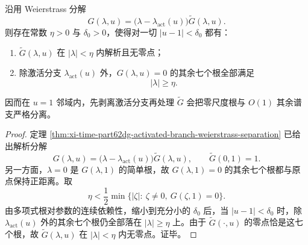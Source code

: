 \begin{conclusion}[剥离激活分支后的统一谱隙与解析稳定性]\label{con:xi-time-part62dga-deflated-uniform-gap}
沿用 Weierstrass 分解
\[
G(\lambda,u)=\bigl(\lambda-\lambda_{\mathrm{act}}(u)\bigr)\widetilde G(\lambda,u).
\]
则存在常数 \(\eta>0\) 与 \(\delta_0>0\)，使得对一切 \(|u-1|<\delta_0\) 都有：
\begin{enumerate}
  \item \(\widetilde G(\lambda,u)\) 在 \(|\lambda|<\eta\) 内解析且无零点；
  \item 除激活分支 \(\lambda_{\mathrm{act}}(u)\) 外，\(G(\lambda,u)=0\) 的其余七个根全部满足
  \[
  |\lambda|\ge \eta.
  \]
\end{enumerate}
因而在 \(u=1\) 邻域内，先剥离激活分支再处理 \(\widetilde G\) 会把零尺度根与 \(O(1)\) 其余谱支严格分离。
\end{conclusion}
\begin{proof}
定理 \ref{thm:xi-time-part62dg-activated-branch-weierstrass-separation} 已给出解析分解
\[
G(\lambda,u)
=
\bigl(\lambda-\lambda_{\mathrm{act}}(u)\bigr)\widetilde G(\lambda,u),
\qquad
\widetilde G(0,1)=1.
\]
另一方面，\(\lambda=0\) 是 \(G(\lambda,1)\) 的简单根，故 \(G(\lambda,1)=0\) 的其余七个根都与原点保持正距离。取
\[
\eta<
\frac12\min\{|\zeta|:\ \zeta\neq 0,\ G(\zeta,1)=0\}.
\]
由多项式根对参数的连续依赖性，缩小到充分小的 \(\delta_0\) 后，当 \(|u-1|<\delta_0\) 时，除 \(\lambda_{\mathrm{act}}(u)\) 外的其余七个根仍全部落在 \(|\lambda|\ge \eta\) 上。由于 \(\widetilde G(\cdot,u)\) 的零点恰是这七个根，故 \(\widetilde G(\lambda,u)\) 在 \(|\lambda|<\eta\) 内无零点。证毕。
\end{proof}

